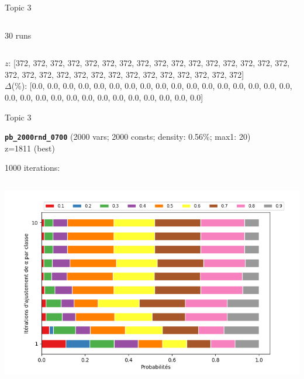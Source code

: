 \documentclass[10pt,xcolor=dvipsnames]{beamer}
\begin{document}
\begin{frame}{Topic 3}
\begin{columns}
\begin{column}{0.45\textwidth}
 30 runs
\end{column}
\end{columns}

{\tiny
$z$: 
[372, 372, 372, 372, 372, 372, 372, 372, 372, 372, 372, 372, 372, 372, 372, 372, 372, 372, 372, 372, 372, 372, 372, 372, 372, 372, 372, 372, 372, 372]\vspace{1mm}\\
$\Delta$(\%): 
[0.0, 0.0, 0.0, 0.0, 0.0, 0.0, 0.0, 0.0, 0.0, 0.0, 0.0, 0.0, 0.0, 0.0, 0.0, 0.0, 0.0, 0.0, 0.0, 0.0, 0.0, 0.0, 0.0, 0.0, 0.0, 0.0, 0.0, 0.0, 0.0, 0.0]\\
}

\end{frame}

\begin{frame}{Topic 3}

\textbf{\texttt{pb\_2000rnd\_0700}} (2000 vars; 2000 consts; density: 0.56\%; max1: 20)\\
z=1811 (best)
\vspace{1mm}

1000 iterations:
\vspace{1mm}


\begin{columns}
\begin{column}{0.575\textwidth}
\centering
\includegraphics[scale=0.35]{proba2000_700.png}


\end{column}
\end{columns}
\end{frame}
\end{document}
